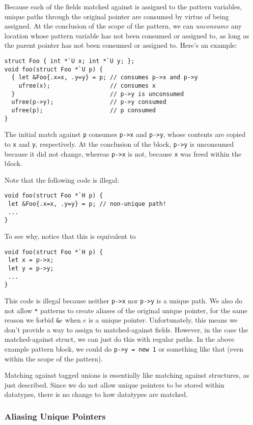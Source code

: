 Because each of the fields matched against is assigned to the pattern
variables, unique paths through the original pointer are consumed by virtue
of being assigned.  At the conclusion of the scope of the pattern, we can
\emph{unconsume} any location whose pattern variable has not been consumed
or assigned to, as long as the parent pointer has not been consumed or
assigned to.  Here's an example:
\begin{verbatim}
struct Foo { int *`U x; int *`U y; };
void foo(struct Foo *`U p) {
  { let &Foo{.x=x, .y=y} = p; // consumes p->x and p->y
    ufree(x);                 // consumes x
  }                           // p->y is unconsumed
  ufree(p->y);                // p->y consumed
  ufree(p);                   // p consumed
}
\end{verbatim}
The initial match against \texttt{p} consumes \texttt{p->x} and
\texttt{p->y}, whose contents are copied to \texttt{x} and \texttt{y},
respectively.  At the conclusion of the block, \texttt{p->y} is unconsumed
because it did not change, whereas \texttt{p->x} is not, because \texttt{x}
was freed within the block.

Note that the following code is illegal:
\begin{verbatim}
void foo(struct Foo *`H p) {
 let &Foo{.x=x, .y=y} = p; // non-unique path!
 ...
}
\end{verbatim}
To see why, notice that this is equivalent to
\begin{verbatim}
void foo(struct Foo *`H p) {
 let x = p->x;
 let y = p->y;
 ...
}
\end{verbatim}
This code is illegal because neither \texttt{p->x} nor \texttt{p->y} is a
unique path.  We also do not allow \texttt{*} patterns to create aliases of
the original unique pointer, for the same reason we forbid \texttt{\&}$e$
when $e$ is a unique pointer.  Unfortunately, this means we don't provide a
way to assign to matched-against fields.  However, in the case the
matched-against struct, we can just do this with regular paths.  In the
above example pattern block, we could do \texttt{p->y = new 1} or something
like that (even within the scope of the pattern).

Matching against tagged unions is essentially like matching against
structures, as just described.  Since we do not allow unique pointers to be
stored within datatypes, there is no change to how datatypes are matched.

\subsubsection{Aliasing Unique Pointers}

